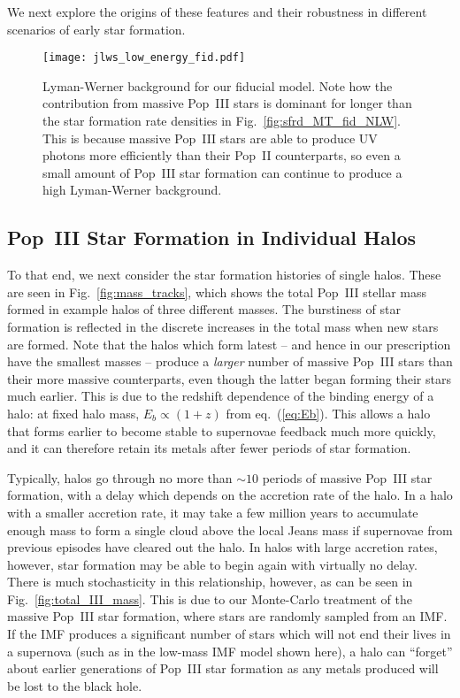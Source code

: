 \documentclass[a4paper,fleqn,usenatbib]{mnras}
\begin{document}
We next explore the origins of these features and their robustness in different scenarios of early star formation.

\begin{figure}
	\texttt{[image: jlws\_low\_energy\_fid.pdf]}
    \caption{Lyman-Werner background for 
    our fiducial model. Note how the contribution from massive Pop~III stars is dominant for longer than the star formation rate densities in Fig.~\ref{fig:sfrd_MT_fid_NLW}. This is 
    because
    massive Pop~III stars are able to produce UV photons more efficiently than their Pop~II counterparts, so even a small amount of Pop~III star formation can continue to produce a high Lyman-Werner background.}
    \label{fig:jlws}
\end{figure}

\subsection{Pop~III Star Formation in Individual Halos}

To that end, we next consider the star formation histories of single halos. 
These are seen in Fig.~\ref{fig:mass_tracks}, which shows the total Pop~III stellar mass formed in 
example halos of three different masses. The burstiness of star formation is reflected in the discrete increases in the total mass when new stars are formed.  
Note that the halos which form latest -- and 
hence in our prescription have the smallest masses -- 
produce a \emph{larger} number of massive Pop~III stars than their 
more massive counterparts, even though the latter 
began forming their stars much earlier. This is due to the redshift dependence 
of the binding energy of a halo: 
at fixed halo mass, $E_b \propto (1+z)$ from eq.~(\ref{eq:Eb}).  
This allows 
a halo that forms earlier to become stable to supernovae feedback much 
more quickly, and it can therefore retain its metals after fewer periods of star formation.

Typically, halos go through no more than $\sim 10$ periods of 
massive Pop~III star formation, with a delay which depends on the accretion rate of the halo. In a halo with a smaller accretion rate, it may take a few million years to accumulate enough mass to form a single cloud above the local Jeans mass if supernovae from previous 
episodes have cleared out the halo. In halos with 
large accretion rates, however, star formation may be able to begin again with 
virtually no delay.
There is much stochasticity in this relationship, however, as can be seen in Fig.~\ref{fig:total_III_mass}. This is due to our Monte-Carlo treatment of the massive Pop~III star formation, where stars are randomly sampled from an IMF. If the IMF produces a significant number of stars which will not end their lives in a supernova (such as in the low-mass IMF model shown here), a halo can ``forget'' about earlier generations of Pop~III star formation as any metals produced will be lost to the black hole.
\end{document}
